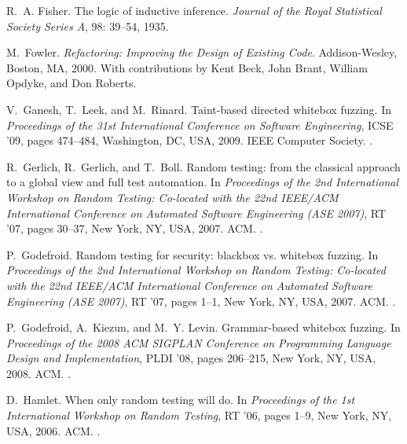 \documentclass[10pt]{sigplanconf}
\begin{document}
\begin{thebibliography}{35}
R.~A. Fisher.
\newblock The logic of inductive inference.
\newblock \emph{Journal of the Royal Statistical Society Series A},
  98: 39--54, 1935.

M.~Fowler.
\newblock \emph{Refactoring: Improving the Design of Existing Code}.
\newblock Addison-Wesley, Boston, MA, 2000.
\newblock With contributions by Kent Beck, John Brant, William Opdyke, and Don
  Roberts.

V.~Ganesh, T.~Leek, and M.~Rinard.
\newblock Taint-based directed whitebox fuzzing.
\newblock In \emph{Proceedings of the 31st International Conference on Software
  Engineering}, ICSE '09, pages 474--484, Washington, DC, USA, 2009. IEEE
  Computer Society.
\newblock {}.

R.~Gerlich, R.~Gerlich, and T.~Boll.
\newblock Random testing: from the classical approach to a global view and full
  test automation.
\newblock In \emph{Proceedings of the 2nd International Workshop on Random
  Testing: Co-located with the 22nd IEEE/ACM International Conference on
  Automated Software Engineering (ASE 2007)}, RT '07, pages 30--37, New York,
  NY, USA, 2007. ACM.
\newblock {}.

P.~Godefroid.
\newblock Random testing for security: blackbox vs. whitebox fuzzing.
\newblock In \emph{Proceedings of the 2nd International Workshop on Random
  Testing: Co-located with the 22nd IEEE/ACM International Conference on
  Automated Software Engineering (ASE 2007)}, RT '07, pages 1--1, New York, NY,
  USA, 2007. ACM.
\newblock {}.

P.~Godefroid, A.~Kiezun, and M.~Y. Levin.
\newblock Grammar-based whitebox fuzzing.
\newblock In \emph{Proceedings of the 2008 ACM SIGPLAN Conference on
  Programming Language Design and Implementation}, PLDI '08, pages 206--215,
  New York, NY, USA, 2008. ACM.
\newblock {}.

D.~Hamlet.
\newblock When only random testing will do.
\newblock In \emph{Proceedings of the 1st International Workshop on Random
  Testing}, RT '06, pages 1--9, New York, NY, USA, 2006. ACM.
\newblock {}.


\end{thebibliography}
\end{document}

